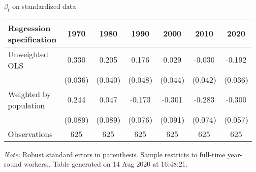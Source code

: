 \begin{center}
\begin{threeparttable}[!h]
\caption{$\beta_t$ on standardized data}
\label{tab:elast_std}
\begin{tabular}{lcccccc}
\toprule
\toprule
\textbf{Regression specification}&\multicolumn{1}{c}{\textbf{1970}}&\multicolumn{1}{c}{\textbf{1980}}&\multicolumn{1}{c}{\textbf{1990}}&\multicolumn{1}{c}{\textbf{2000}}&\multicolumn{1}{c}{\textbf{2010}}&\multicolumn{1}{c}{\textbf{2020}} \\
\midrule
Unweighted OLS      &       0.330\sym{***}&       0.205\sym{***}&       0.176\sym{***}&       0.029         &      -0.030         &      -0.192\sym{***}\\
                    &     (0.036)         &     (0.040)         &     (0.048)         &     (0.044)         &     (0.042)         &     (0.036)         \\
Weighted by population&       0.244\sym{**} &       0.047         &      -0.173\sym{*}  &      -0.301\sym{**} &      -0.283\sym{***}&      -0.300\sym{***}\\
                    &     (0.089)         &     (0.089)         &     (0.076)         &     (0.091)         &     (0.074)         &     (0.057)         \\
\midrule Observations&         625         &         625         &         625         &         625         &         625         &         625         \\
\bottomrule
\bottomrule
\end{tabular}
\begin{tablenotes}
\item \footnotesize \textit{Note:} Robust standard errors in parenthesis. Sample restricts to full-time year-round workers.. Table generated on 14 Aug 2020 at 16:48:21.
\end{tablenotes}
\end{threeparttable}
\end{center}
